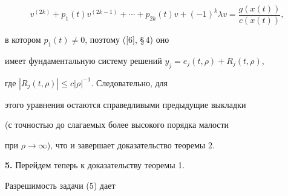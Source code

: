 $$ 


v^{(2k)}+p_1(t)v^{(2k-1)}+\dotsb+p_{2k}(t)v+(-1)^k\lambda v= 


\frac{g(x(t))}{c(x(t))},


$$ 


в котором $p_1(t)\ne0$, поэтому ([6], \S\,4) оно 


имеет фундаментальную систему решений $y_j=e_j(t,\rho)+R_j(t,\rho)$, 


где $|R_j(t,\rho)|\le c|\rho|^{-1}$. Следовательно, для 


этого уравнения остаются справедливыми предыдущие выкладки 


(с точностью до слагаемых более высокого порядка малости  


при $\rho\to\infty$), что и завершает доказательство теоремы 2. 


\medskip


 


{\bf 5.} Перейдем теперь к доказательству теоремы 1. 


Разрешимость задачи (5) дает 


 


